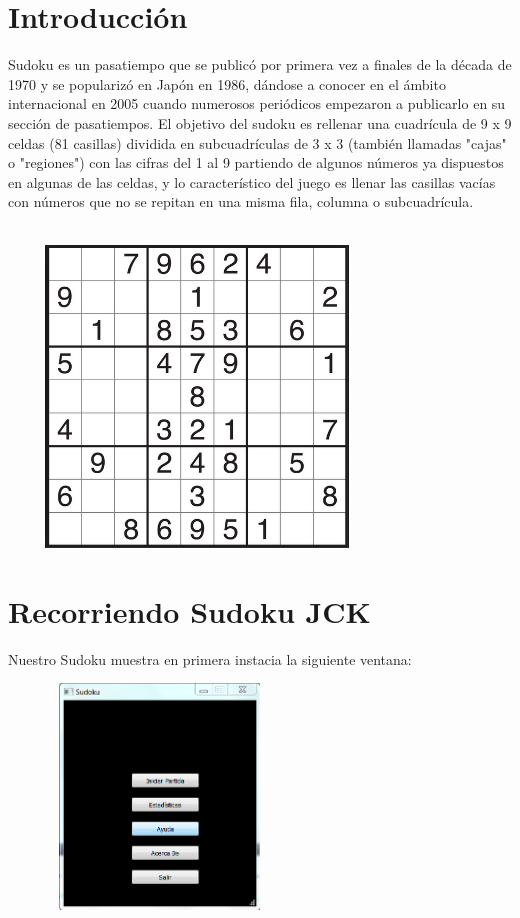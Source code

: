 \documentclass[12pt]{article}
\begin{document}
\section{Introducción}

Sudoku es un pasatiempo que se publicó por primera vez a finales de la década de 1970 y se popularizó en Japón en 1986, dándose a conocer en el ámbito internacional en 2005 cuando numerosos periódicos empezaron a publicarlo en su sección de pasatiempos. El objetivo del sudoku es rellenar una cuadrícula de 9 x 9 celdas (81 casillas) dividida en subcuadrículas de 3 x 3 (también llamadas "cajas" o "regiones") con las cifras del 1 al 9 partiendo de algunos números ya dispuestos en algunas de las celdas, y lo característico del juego es llenar las casillas vacías con números que no se  repitan en una misma fila, columna o subcuadrícula. \\\\
\begin{center}
		\includegraphics[height=8cm,width=10cm]{sdk.png}
	\end{center}
	
	




\section{Recorriendo Sudoku JCK}

	Nuestro Sudoku muestra en primera instacia la siguiente ventana:
	\begin{center}
		\includegraphics[height=6cm,width=8cm]{ventana_principal.png}
	\end{center}
\end{document}
